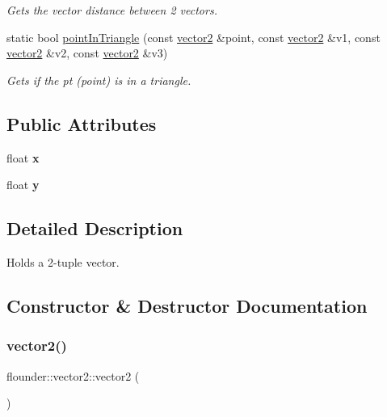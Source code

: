 \begin{DoxyCompactItemize}
\begin{DoxyCompactList}\small\item\em Gets the vector distance between 2 vectors. \end{DoxyCompactList}\item 
static bool \hyperlink{classflounder_1_1vector2_a99be81b66c5723b8a163046a07f55765}{point\+In\+Triangle} (const \hyperlink{classflounder_1_1vector2}{vector2} \&point, const \hyperlink{classflounder_1_1vector2}{vector2} \&v1, const \hyperlink{classflounder_1_1vector2}{vector2} \&v2, const \hyperlink{classflounder_1_1vector2}{vector2} \&v3)
\begin{DoxyCompactList}\small\item\em Gets if the pt (point) is in a triangle. \end{DoxyCompactList}\end{DoxyCompactItemize}
\subsection*{Public Attributes}
\begin{DoxyCompactItemize}
\item 
\mbox{\label{classflounder_1_1vector2_a750de29476a232b2819bfbe2eca12d63}} 
float {\bfseries x}
\item 
\mbox{\label{classflounder_1_1vector2_af5c9aa672e4fcda3ef4f8c7a97705007}} 
float {\bfseries y}
\end{DoxyCompactItemize}


\subsection{Detailed Description}
Holds a 2-\/tuple vector. 



\subsection{Constructor \& Destructor Documentation}
\mbox{\label{classflounder_1_1vector2_add30cfbc22d19411719748238464aa18}} 
\subsubsection{\texorpdfstring{vector2()}{vector2()}\hspace{0.1cm}{\footnotesize\ttfamily [1/3]}}
{\footnotesize\ttfamily flounder\+::vector2\+::vector2 (\begin{DoxyParamCaption}{ }\end{DoxyParamCaption})}



